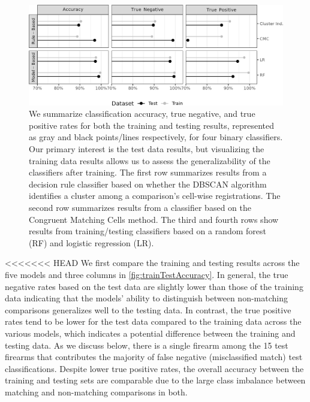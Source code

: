 \documentclass[reprint]{JASA}
\begin{document}
\begin{figure}[htbp]

{\centering \includegraphics[width=\textwidth]{images/resultsPlots/classifResultsPlt_trainTest} 

}

\caption{\label{fig:trainTestAccuracy} We summarize classification accuracy, true negative, and true positive rates for both the training and testing results, represented as gray and black points/lines respectively, for four binary classifiers. Our primary interest is the test data results, but visualizing the training data results allows us to assess the generalizability of the classifiers after training. The first row summarizes results from a decision rule classifier based on whether the DBSCAN algorithm identifies a cluster among a comparison's cell-wise registrations. The second row summarizes results from a classifier based on the Congruent Matching Cells method. The third and fourth rows show results from training/testing classifiers based on a random forest (RF) and logistic regression (LR).}\label{fig:unnamed-chunk-9}
\end{figure}

<<<<<<< HEAD
We first compare the training and testing results across the five models
and three columns in \autoref{fig:trainTestAccuracy}. In general, the
true negative rates based on the test data are slightly lower than those
of the training data indicating that the models' ability to distinguish
between non-matching comparisons generalizes well to the testing data.
In contrast, the true positive rates tend to be lower for the test data
compared to the training data across the various models, which indicates
a potential difference between the training and testing data. As we
discuss below, there is a single firearm among the 15 test firearms that
contributes the majority of false negative (misclassified match) test
classifications. Despite lower true positive rates, the overall accuracy
between the training and testing sets are comparable due to the large
class imbalance between matching and non-matching comparisons in both.
\end{document}
